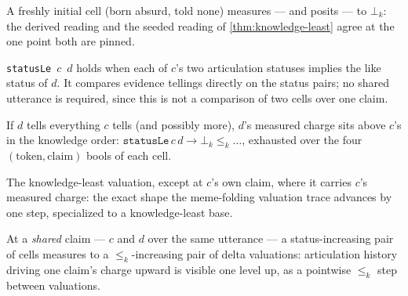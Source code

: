 \begin{theorem}\label{thm:meme-initial-charge}\leanok{}
A freshly initial cell (born absurd, told none) measures --- and posits ---
to \(\bot_k\): the derived reading and the seeded reading of
\cref{thm:knowledge-least} agree at the one point both are pinned.
\end{theorem}

\begin{definition}\label{thm:statusle}\leanok{}
\texttt{statusLe}~\(c\)~\(d\) holds when each of \(c\)'s two articulation
statuses implies the like status of \(d\). It compares evidence tellings
directly on the status pairs; no shared utterance is required, since this is
not a comparison of two cells over one claim.
\end{definition}

\begin{theorem}\label{thm:measure-mono}\leanok{}
If \(d\) tells everything \(c\) tells (and possibly more), \(d\)'s measured
charge sits above \(c\)'s in the knowledge order: \(\texttt{statusLe}\,c\,d
\to \bot_k \le_k \dots\), exhausted over the four \((\mathrm{token},
\mathrm{claim})\) bools of each cell.
\end{theorem}

\begin{definition}\label{thm:deltavaluation}\leanok{}
The knowledge-least valuation, except at \(c\)'s own claim, where it carries
\(c\)'s measured charge: the exact shape the meme-folding valuation trace
advances by one step, specialized to a knowledge-least base.
\end{definition}

\begin{theorem}\label{thm:deltavaluation-mono}\leanok{}
At a \emph{shared} claim --- \(c\) and \(d\) over the same utterance --- a
status-increasing pair of cells measures to a \(\le_k\)-increasing pair of
delta valuations: articulation history driving one claim's charge upward is
visible one level up, as a pointwise \(\le_k\) step between valuations.
\end{theorem}

